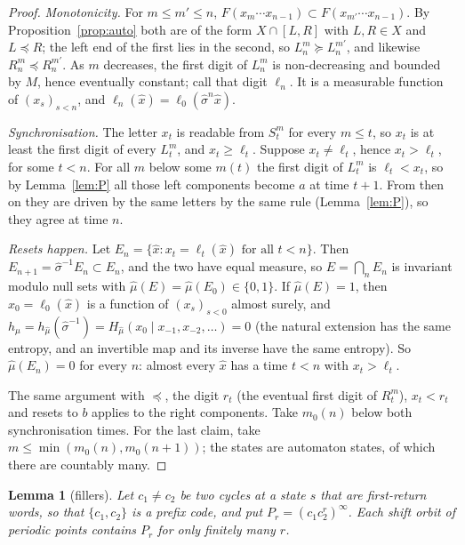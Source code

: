 \documentclass[11pt]{amsart}
\newtheorem{lemma}[theorem]{Lemma}
\theoremstyle{definition}
\theoremstyle{remark}
\newcommand{\lex}{\preccurlyeq}
\newcommand{\gex}{\succcurlyeq}
\begin{document}
\begin{proof}
\emph{Monotonicity.} For $m\le m'\le n$, $F(x_m\cdots x_{n-1})\subset F(x_{m'}\cdots x_{n-1})$. By Proposition~\ref{prop:auto} both are of the form $X\cap[L,R]$ with $L,R\in X$ and $L\lex R$; the left end of the first lies in the second, so $L^m_n\gex L^{m'}_n$, and likewise $R^m_n\lex R^{m'}_n$. As $m$ decreases, the first digit of $L^m_n$ is non-decreasing and bounded by $M$, hence eventually constant; call that digit $\ell_n$. It is a measurable function of $(x_s)_{s<n}$, and $\ell_n(\hat x)=\ell_0(\hat\sigma^n\hat x)$.

\emph{Synchronisation.} The letter $x_t$ is readable from $S^m_t$ for every $m\le t$, so $x_t$ is at least the first digit of every $L^m_t$, and $x_t\ge\ell_t$. Suppose $x_t\ne\ell_t$, hence $x_t>\ell_t$, for some $t<n$. For all $m$ below some $m(t)$ the first digit of $L^m_t$ is $\ell_t<x_t$, so by Lemma~\ref{lem:P} all those left components become $a$ at time $t+1$. From then on they are driven by the same letters by the same rule (Lemma~\ref{lem:P}), so they agree at time $n$.

\emph{Resets happen.} Let $E_n=\{\hat x:x_t=\ell_t(\hat x)\text{ for all }t<n\}$. Then $E_{n+1}=\hat\sigma^{-1}E_n\subset E_n$, and the two have equal measure, so $E=\bigcap_nE_n$ is invariant modulo null sets with $\hat\mu(E)=\hat\mu(E_0)\in\{0,1\}$. If $\hat\mu(E)=1$, then $x_0=\ell_0(\hat x)$ is a function of $(x_s)_{s<0}$ almost surely, and $h_\mu=h_{\hat\mu}(\hat\sigma^{-1})=H_{\hat\mu}(x_0\mid x_{-1},x_{-2},\dots)=0$ (the natural extension has the same entropy, and an invertible map and its inverse have the same entropy). So $\hat\mu(E_n)=0$ for every $n$: almost every $\hat x$ has a time $t<n$ with $x_t>\ell_t$.

The same argument with $\lex$, the digit $r_t$ (the eventual first digit of $R^m_t$), $x_t<r_t$ and resets to $b$ applies to the right components. Take $m_0(n)$ below both synchronisation times. For the last claim, take $m\le\min(m_0(n),m_0(n+1))$; the states are automaton states, of which there are countably many.
\end{proof}

\begin{lemma}[fillers]\label{lem:S2}
Let $c_1\ne c_2$ be two cycles at a state $s$ that are first-return words, so that $\{c_1,c_2\}$ is a prefix code, and put $P_r=(c_1c_2^r)^\infty$. Each shift orbit of periodic points contains $P_r$ for only finitely many $r$.
\end{lemma}
\end{document}
